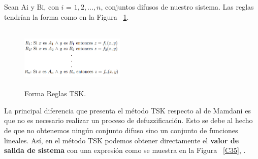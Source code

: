 \documentclass[10pt,conference]{IEEEtran}
\begin{document}
Sean Ai y Bi, con $i$ = $1, 2, ..., n$, conjuntos difusos de nuestro sistema. Las reglas tendrían la forma como en la Figura ~\ref{C36}.

    \begin{figure}[H]
    \begin{center}
    \includegraphics[width=5cm,height=3cm]{figuras/r15.PNG}
    \caption{Forma Reglas TSK.}
    \label{C36} 
    \end{center}
    \end{figure}

La principal diferencia que presenta el método TSK respecto al de Mamdani es que no es necesario realizar un proceso de defuzzificación. Esto se debe al hecho de que no obtenemos ningún conjunto difuso sino un conjunto de funciones lineales. Así, en el método TSK podemos obtener directamente el \textbf{valor de salida de sistema} con una expresión como se muestra en la Figura ~\ref{C35}, \citep{thaker2018analysis}.
\end{document}
